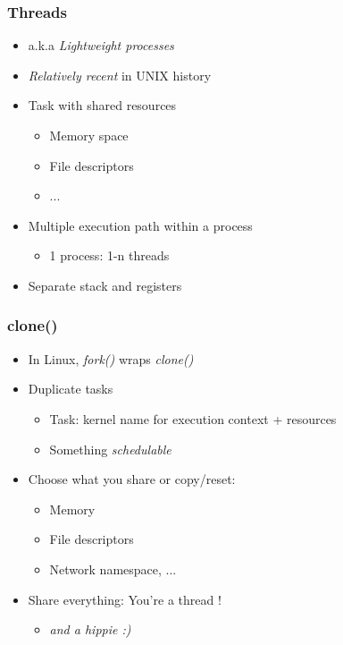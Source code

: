 \begin{frame}
  \frametitle{Threads}

  \begin{itemize}
  \item a.k.a \emph{Lightweight processes}
  \item \emph{Relatively recent} in UNIX history
  \item Task with shared resources
    \begin{itemize}
    \item Memory space
    \item File descriptors
    \item ...
    \end{itemize}
  \item Multiple execution path within a process
    \begin{itemize}
    \item 1 process: 1-n threads
    \end{itemize}
  \item Separate stack and registers
  \end{itemize}
\end{frame}


\begin{frame}
  \frametitle{clone()}

  \begin{itemize}
  \item In Linux, \emph{fork()} wraps \emph{clone()}
  \item Duplicate tasks
    \begin{itemize}
    \item Task: kernel name for execution context + resources
    \item Something \emph{schedulable}
    \end{itemize}
  \item Choose what you share or copy/reset:
    \begin{itemize}
    \item Memory
    \item File descriptors
    \item Network namespace, ...
    \end{itemize}
  \item Share everything: You're a thread !
    \begin{itemize}
    \item \emph{and a hippie :)}
    \end{itemize}
  \end{itemize}
\end{frame}
